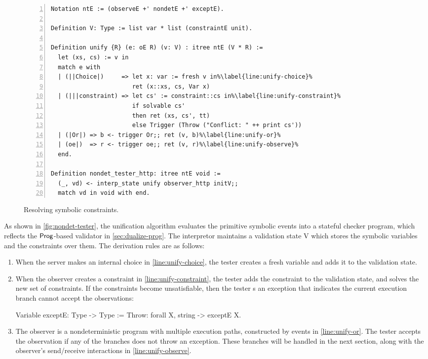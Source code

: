 \begin{figure}
\begin{lstlisting}[style=customcoq,numbers=left,escapechar=\%]
Notation ntE := (observeE +' nondetE +' exceptE).

Definition V: Type := list var * list (constraintE unit).
  
Definition unify {R} (e: oE R) (v: V) : itree ntE (V * R) :=
  let (xs, cs) := v in
  match e with
  | (||Choice|)     => let x: var := fresh v in%\label{line:unify-choice}%
                       ret (x::xs, cs, Var x)
  | (|||constraint) => let cs' := constraint::cs in%\label{line:unify-constraint}%
                       if solvable cs'
                       then ret (xs, cs', tt)
                       else Trigger (Throw ("Conflict: " ++ print cs'))
  | (|Or|) => b <- trigger Or;; ret (v, b)%\label{line:unify-or}%
  | (oe|)  => r <- trigger oe;; ret (v, r)%\label{line:unify-observe}%
  end.

Definition nondet_tester_http: itree ntE void :=
  (_, vd) <- interp_state unify observer_http initV;;
  match vd in void with end.
\end{lstlisting}
\caption{Resolving symbolic constraints.}
\label{fig:nondet-tester}
\end{figure}

As shown in \autoref{fig:nondet-tester}, the unification algorithm evaluates the
primitive symbolic events into a stateful checker program, which reflects the
$\mathsf{Prog}$-based validator in \autoref{sec:dualize-prog}.  The interpretor
maintains a validation state \ilc V which stores the symbolic variables and the
constraints over them.  The derivation rules are as follows:
\begin{enumerate}
  \item When the server makes an internal choice in \autoref{line:unify-choice},
    the tester creates a fresh variable and adds it to the validation state.
  \item When the observer creates a constraint in
    \autoref{line:unify-constraint}, the tester adds the constraint to the
    validation state, and solves the new set of constraints.  If the constraints
    become unsatisfiable, then the tester s an exception that
    indicates the current execution branch cannot accept the observations:
\begin{coq}
  Variable exceptE: Type -> Type :=
    Throw: forall {X}, string -> exceptE X.
\end{coq}      
  \item The observer is a nondeterministic program with multiple execution
    paths, constructed by  events in \autoref{line:unify-or}.  The
    tester accepts the observation if any of the branches does not throw an
    exception.  These branches will be handled in the next section, along with
    the observer's send/receive interactions in \autoref{line:unify-observe}.
\end{enumerate}

